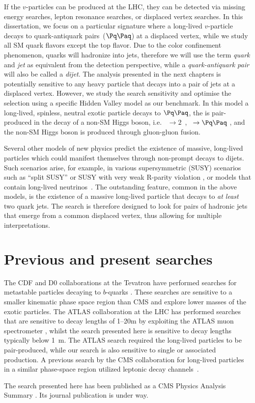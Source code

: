 If the $v$-particles can be produced at the LHC, they can be detected via missing energy 
searches, lepton resonance searches, or displaced vertex searches. In this dissertation,
we focus on a particular signature where a long-lived $v$-particle 
decays to quark-antiquark pairs~($\qq$) at a displaced vertex,
 while we study all SM quark flavors except the top flavor. Due to the color confinement 
phenomenon, quarks
will hadronize into jets, therefore we will use the term {\it quark} and  {\it jet} as 
 equivalent from the detection perspective,
while a {\it quark-antiquark pair} will also be called a {\it dijet}.
The analysis presented in the next chapters is potentially sensitive 
to any heavy particle that decays into a pair of jets 
 at a displaced vertex. However, we study the search sensitivity and optimise the selection
 using a 
specific Hidden Valley
model as our benchmark. In this model a long-lived, spinless, neutral
exotic particle \X decays to $\qq$,
 the \X is pair-produced in the decay of a non-SM Higgs boson, i.e.  \Higgs~$\to
2$\X~, \X~$\to \qq$ \cite{Strassler:2006ri}, and 
the non-SM Higgs boson is produced through gluon-gluon
fusion. 

Several other models of new physics predict the existence of massive, 
long-lived particles which could
manifest themselves through non-prompt decays to dijets. Such scenarios arise, for example,
in various supersymmetric (SUSY) scenarios such as ``split SUSY''
\cite{Hewett:2004nw} or SUSY with very weak R-parity violation \cite{Barbier:2004ez}, 
or \Zprime models
that contain long-lived neutrinos~\cite{Basso:2008iv}. 
The outstanding feature, common in the above models,
is the existence of a massive long-lived particle that decays to {\it at least} two
quark jets. The search is therefore designed to look for pairs of hadronic jets
 that emerge from a common displaced vertex, thus allowing 
for multiple interpretations.

\section{Previous and present searches}

The CDF and D0 collaborations at the Tevatron have performed searches for metastable particles decaying to $b$-quarks
\cite{Aaltonen:2011rja, Abazov:2009ik}.
These searches are sensitive to a smaller kinematic phase space region than CMS and explore
lower masses of the exotic particles. The ATLAS collaboration
at the LHC has performed searches that are sensitive to decay lengths of 1--20\unit{m} by exploiting the ATLAS muon
 spectrometer \cite{ATLAS:2012av}, whilst the search presented here is sensitive to decay lengths 
typically below 1~m.
 The ATLAS search required the long-lived particles to be pair-produced,
while our search
is also sensitive to single or associated production.
A previous search by the CMS collaboration for long-lived particles in a similar phase-space region utilized leptonic decay channels~\cite{Chatrchyan:2012jna}.

The search presented here has been published as a CMS Physics Analysis Summary 
\cite{CMS-PAS-EXO-12-038}. Its journal publication is under way.
